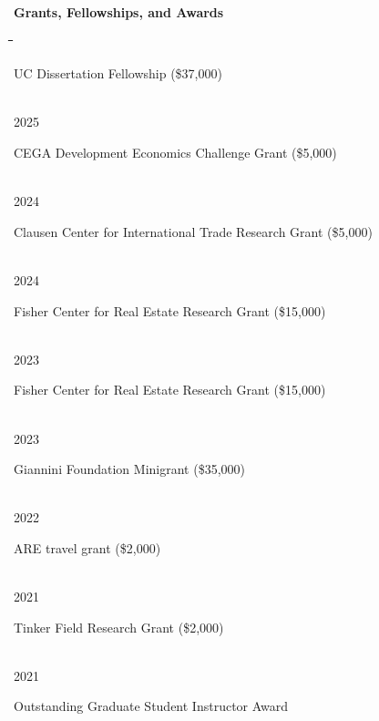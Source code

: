 \documentclass[10pt, oneside]{article}
\makeatletter
\newlength\tdima
\newcommand\tabfill[1]{%
      \setlength\tdima{\linewidth}%
      \addtolength\tdima{\@totalleftmargin}%
      \addtolength\tdima{-\dimen\@curtab}%
      \parbox[t]{\tdima}{#1\ifhmode\strut\fi}}
\newcommand\mytabs{\hspace*{1cm}\=\hspace{1cm}\=\hspace{1cm}\=\hspace{1cm}\=\hspace{1cm}\=\hspace{1cm}\=\hspace{1cm}\=\hspace{1cm}\=\hspace{1cm}\=\hspace{1cm}}
\newenvironment{mysec}[1][\mytabs]
  {\begin{tabbing}#1\kill\ignorespaces}
  {\end{tabbing}}
\makeatother
\begin{document}
\begin{minipage}[t]{0.1\linewidth}
\textbf{Grants, Fellowships, and Awards}
\end{minipage}\hspace{0.05\linewidth}
\begin{minipage}[t]{0.8\linewidth}
\begin{mysec} 
	2025 \>\>\tabfill{UC Dissertation Fellowship (\$37,000)} \\
    2025 \>\>\tabfill{CEGA Development Economics Challenge Grant (\$5,000)} \\
    2024 \>\>\tabfill{Clausen Center for International Trade Research Grant (\$5,000)} \\
    2024 \>\>\tabfill{Fisher Center for Real Estate Research Grant  (\$15,000)} \\
	2023 \>\>\tabfill{Fisher Center for Real Estate Research Grant  (\$15,000)} \\
    2023 \>\>\tabfill{Giannini Foundation Minigrant  (\$35,000)} \\
    2022 \>\>\tabfill{ARE travel grant  (\$2,000)} \\
    2021 \>\>\tabfill{Tinker Field Research Grant (\$2,000)}\\ 
    2021 \>\>\tabfill{Outstanding Graduate Student Instructor Award}
\end{mysec} 
\end{minipage}\vspace{5mm}
\end{document}

